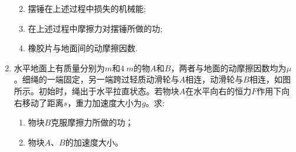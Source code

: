\begin{enumerate}[leftmargin=0em]
\begin{enumerate}
\renewcommand{\labelenumi}{\arabic{enumi}.}
\item
摆锤在上述过程中损失的机械能;
\item 
在上述过程中摩擦力对摆锤所做的功;
\item 
橡胶片与地面间的动摩擦因数.



\end{enumerate}
\begin{figure}[h!]
\flushright

\end{figure}







\item
{}
水平地面上有质量分别为$ m $和$ 4 \ m $的物$ A $和$ B $，两者与地面的动摩擦因数均为$ \mu $。细绳的一端固定，另一端跨过轻质动滑轮与$ A $相连，动滑轮与$ B $相连，如图所示。初始时，绳出于水平拉直状态。若物块$ A $在水平向右的恒力$ F $作用下向右移动了距离$ s $，重力加速度大小为$ g $。求:

\begin{enumerate}
\renewcommand{\labelenumi}{\arabic{enumi}.}
\item
物块$ B $克服摩擦力所做的功；
\item 
物块$ A $、$ B $的加速度大小。





\end{enumerate}
\end{enumerate}
